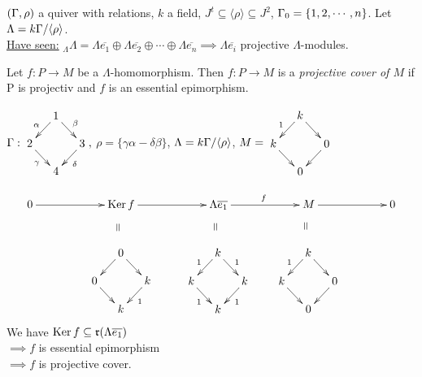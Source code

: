 \begin{exam}
$(\Gamma, \rho)$ a quiver with relations, $k$ a field, $J^t \subseteq
\langle \rho \rangle \subseteq J^2$, $\Gamma_0 = \{ 1, 2, \cdots , n
\}$. Let $\Lambda = k\Gamma / \langle \rho \rangle$.\\ 
\underline{Have seen:} $_\Lambda\Lambda = \Lambda \overline{e_1}
\oplus \Lambda \overline{e_2} \oplus \cdots \oplus \Lambda
\overline{e_n} \implies \Lambda \overline{e_i}$ projective
$\Lambda$-modules. 
\end{exam}

\begin{defin}
  Let $f\colon  P \to M$ be a $\Lambda$-homomorphism. Then $f\colon P\to M$ is a
  \emph{projective cover of $M$} if P is projectiv and $f$ is an
  essential epimorphism.
\end{defin}

\begin{exam}
$\G:
\vcenter{\xymatrix@C-1pc@R-1pc{
&1\ar[dl]_\alpha \ar[dr]^\beta&\\
2 \ar[dr]_\gamma&&3 \ar[dl]^\delta\\
&4&
}},$ 
$\rho = \{ \gamma\alpha -\delta\beta \}$, $\Lambda = k\Gamma / \langle \rho \rangle$, $M = \vcenter{\xymatrix@C-1pc@R-1pc{
&k\ar[dl]_1 \ar[dr]&\\
k \ar[dr]&&0 \ar[dl]\\
&0&
}}$

\[
\xy
\POS(0,0)
\xymatrix"seq"@C5pc{
0 \ar[r] & \Ker f \ar[r] & \Lambda \overline{e_1} \ar[r]^f & M \ar[r] & 0
}
\POS(20, -15)
\xymatrix@C-4pc@R-1pc{
&0\ar[dl] \ar[dr] \ar@{}["seq"]|-*[@]{=}&\\
0 \ar[dr]&&k \ar[dl]^1\\
&k&
}
\POS(50, -15)
\xymatrix{
&k\ar[dl]_1 \ar[dr]^1 \ar@{}["seq"r]|-*[@]{=}&\\
k \ar[dr]_1&&k \ar[dl]^1\\
&k&
}\POS(78, -15)
\xymatrix{
&k\ar[dl]_1 \ar[dr] \ar@{}["seq"rr]|-*[@]{=}&\\
k \ar[dr]&&0 \ar[dl]\\
&0&
}
\endxy
\]
We have $\operatorname{Ker}\nolimits f \subseteq \mathfrak{r}(\Lambda \overline{e_1})$\\
$\implies f$ is essential epimorphism\\
$\implies f$ is projective cover.
\end{exam}

